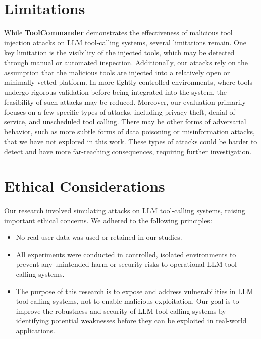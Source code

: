 \section{Limitations}
While  \textbf{ToolCommander} demonstrates the effectiveness of malicious tool injection attacks on LLM tool-calling systems, several limitations remain. One key limitation is the visibility of the injected tools, which may be detected through manual or automated inspection. Additionally, our attacks rely on the assumption that the malicious tools are injected into a relatively open or minimally vetted platform. In more tightly controlled environments, where tools undergo rigorous validation before being integrated into the system, the feasibility of such attacks may be reduced. Moreover, our evaluation primarily focuses on a few specific types of attacks, including privacy theft, denial-of-service, and unscheduled tool calling. There may be other forms of adversarial behavior, such as more subtle forms of data poisoning or misinformation attacks, that we have not explored in this work. These types of attacks could be harder to detect and have more far-reaching consequences, requiring further investigation.

\section{Ethical Considerations}

Our research involved simulating attacks on LLM tool-calling systems, raising important ethical concerns. We adhered to the following principles:

\begin{itemize}
    \item No real user data was used or retained in our studies.
    \item All experiments were conducted in controlled, isolated environments to prevent any unintended harm or security risks to operational LLM tool-calling systems.
    \item The purpose of this research is to expose and address vulnerabilities in LLM tool-calling systems, not to enable malicious exploitation. Our goal is to improve the robustness and security of LLM tool-calling systems by identifying potential weaknesses before they can be exploited in real-world applications.
\end{itemize}

